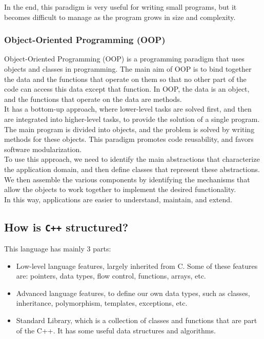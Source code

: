 In the end, this paradigm is very useful for writing small programs, but it becomes difficult to manage 
as the program grows in size and complexity.\\

\subsubsection{Object-Oriented Programming (OOP)}

Object-Oriented Programming (OOP) is a programming paradigm that uses objects and classes in programming.
The main aim of OOP is to bind together the data and the functions that operate on them so that no other
part of the code can access this data except that function. In OOP, the data is an object, and the functions
that operate on the data are methods.\\

It has a bottom-up approach, where lower-level tasks are solved first, and then are integrated into higher-level
tasks, to provide the solution of a single program. The main program is divided into objects, and the problem is 
solved by writing methods for these objects. This paradigm promotes code reusability, and favors software 
modularization.\\

To use this approach, we need to identify the main abstractions that characterize the application domain, and 
then define classes that represent these abstractions. We then assemble the various components by identifying
the mechanisms that allow the objects to work together to implement the desired functionality.\\

In this way, applications are easier to understand, maintain, and extend.


\subsection{How is \texttt{C++} structured?}

This language has mainly 3 parts:

\begin{itemize}
    \item Low-level language features, largely inherited from C. Some of these features are: pointers,
    data types, flow control, functions, arrays, etc.

    \item Advanced language features, to define our own data types, such as classes, inheritance, 
    polymorphism, templates, exceptions, etc.

    \item Standard Library, which is a collection of classes and functions that are part of the C++.
    It has some useful data structures and algorithms.\\
\end{itemize}


